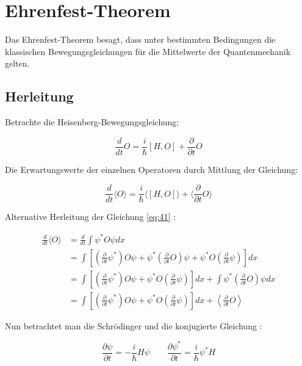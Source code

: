 



\section{Ehrenfest-Theorem}

Das Ehrenfest-Theorem besagt, dass unter bestimmten Bedingungen die klassischen Bewegungsgleichungen für die Mittelwerte der Quantenmechanik gelten.

\subsection{Herleitung}

Betrachte die Heisenberg-Bewegungsgleichung:

\[ \frac{d}{dt} O = \frac{i}{\hbar} [H,O] +\frac{\partial}{\partial t} O \]

Die Erwartungswerte der einzelnen Operatoren durch Mittlung der Gleichung:

\begin{equation} 
\label{eq:41}
\boxed{\frac{d}{dt} \langle O\rangle  = \frac{i}{\hbar} \langle [H,O]\rangle  + \langle  \frac{\partial}{\partial t}  O\rangle } 
\end{equation}

Alternative Herleitung der Gleichung \eqref{eq:41} :

\begin{align}
\frac{d}{dt}\langle  O\rangle  &=  \frac{d}{dt} \int \psi^* O \psi dx \\
&=  \int \left[\left(\frac{\partial}{\partial t} \psi^*\right) O\psi +  \psi^*  \left(\frac{\partial}{\partial t} O\right) \psi + \psi^* O\left(\frac{\partial}{\partial t} \psi\right)\right]dx\\
&=  \int \left[\left(\frac{\partial}{\partial t} \psi^*\right) O\psi  + \psi^* O\left(\frac{\partial}{\partial t} \psi\right)\right]dx + \int  \psi^*  \left(\frac{\partial}{\partial t} O\right) \psi dx \\
&=  \int \left[\left(\frac{\partial}{\partial t} \psi^*\right) O\psi  + \psi^* O\left(\frac{\partial}{\partial t} \psi\right)\right]dx +  \left\langle  \frac{\partial}{\partial t} O\right\rangle \label{eq:40}
\end{align}

Nun betrachtet man die Schrödinger und die konjugierte Gleichung :

\[ \frac{\partial \psi}{\partial t} = -\frac{i}{\hbar}H\psi \qquad \frac{\partial \psi^*}{\partial t} = \frac{i}{\hbar}\psi^* H   \]

